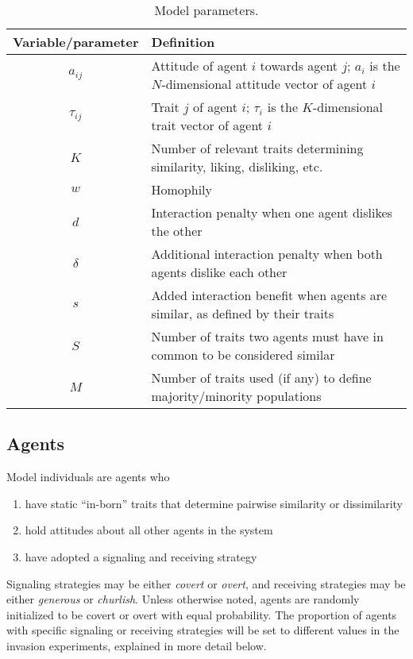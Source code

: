 \documentclass[11pt,letterpaper]{article}
\begin{document}
\vspace{1em}
\begin{table}[H]
  \centering
  \begin{tabular}{cl}
    Variable/parameter & Definition \\
    \toprule 
    $a_{ij}$   & Attitude of agent $i$ towards agent $j$; $a_i$ is the $N$-dimensional 
      attitude vector of agent $i$ \\
    $\tau_{ij}$ & Trait $j$ of agent $i$; $\tau_i$ is the $K$-dimensional trait vector of agent $i$ \\
    $K$      & Number of relevant traits determining similarity, liking, disliking, etc. \\
    $w$      & Homophily \\
    $d$      & Interaction penalty when one agent dislikes the other \\
    $\delta$ & Additional interaction penalty when both agents dislike each other \\
    $s$      & Added interaction benefit when agents are similar, as defined by their traits \\
    $S$      & Number of traits two agents must have in common to be considered similar \\
    $M$      & Number of traits used (if any) to define majority/minority populations \\
  \end{tabular}
  \caption{Model parameters.}
  \label{tab:params}
\end{table}

\subsection{Agents}

Model individuals are agents who 
\begin{enumerate}
  \item have static ``in-born'' traits that determine pairwise similarity or dissimilarity
  \item hold attitudes about all other agents in the system
  \item have adopted a signaling and receiving strategy
\end{enumerate}Signaling strategies
may be either \emph{covert} or \emph{overt}, and receiving strategies may be
either \emph{generous} or \emph{churlish}. Unless otherwise noted, agents are
randomly initialized to be covert or overt with equal probability. The 
proportion of agents with specific signaling or receiving strategies will be
set to different values in the invasion experiments, explained in more detail below.
\end{document}

